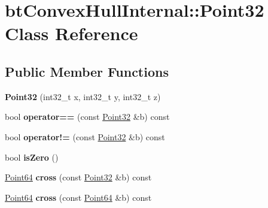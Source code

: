 \hypertarget{classbtConvexHullInternal_1_1Point32}{}\section{bt\+Convex\+Hull\+Internal\+:\+:Point32 Class Reference}
\label{classbtConvexHullInternal_1_1Point32}
\subsection*{Public Member Functions}
\begin{DoxyCompactItemize}
\item 
\mbox{\label{classbtConvexHullInternal_1_1Point32_a5cb36afa59e42669256a8221963e884f}} 
{\bfseries Point32} (int32\+\_\+t x, int32\+\_\+t y, int32\+\_\+t z)
\item 
\mbox{\label{classbtConvexHullInternal_1_1Point32_aed431a95887fda23386a3523fd37a9ac}} 
bool {\bfseries operator==} (const \hyperlink{classbtConvexHullInternal_1_1Point32}{Point32} \&b) const
\item 
\mbox{\label{classbtConvexHullInternal_1_1Point32_a90a4984b35ab561edf2253c2f4e2bb55}} 
bool {\bfseries operator!=} (const \hyperlink{classbtConvexHullInternal_1_1Point32}{Point32} \&b) const
\item 
\mbox{\label{classbtConvexHullInternal_1_1Point32_aecd1940311b7d379fbda8716a6bc5ca2}} 
bool {\bfseries is\+Zero} ()
\item 
\mbox{\label{classbtConvexHullInternal_1_1Point32_acd870f3cbcfce330340256b1a764ee0b}} 
\hyperlink{classbtConvexHullInternal_1_1Point64}{Point64} {\bfseries cross} (const \hyperlink{classbtConvexHullInternal_1_1Point32}{Point32} \&b) const
\item 
\mbox{\label{classbtConvexHullInternal_1_1Point32_a90e9c9b2d687b813e34c6661474dcb65}} 
\hyperlink{classbtConvexHullInternal_1_1Point64}{Point64} {\bfseries cross} (const \hyperlink{classbtConvexHullInternal_1_1Point64}{Point64} \&b) const
\item 

\end{DoxyCompactItemize}
